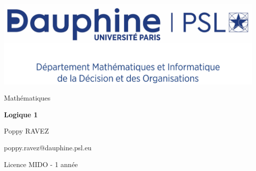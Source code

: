 \documentclass{report}
\author{Prénom NOM}
\begin{document}
\centering
\includegraphics[scale=0.08]{../../../logo/pdf/MIDO_centre}


\sffamily
\vspace{6cm}
\LARGE
\mdseries
Mathématiques

\huge
\bfseries
Logique 1

\vspace{3cm}
\rmfamily

\mdseries
\makeatletter
\large
Poppy RAVEZ

\vspace{0.2cm}
\normalsize
poppy.ravez@dauphine.psl.eu

\vspace{0.2cm}
Licence MIDO - 1\iere{} année

\vspace{5cm}
\@date
\makeatother
\end{document}
